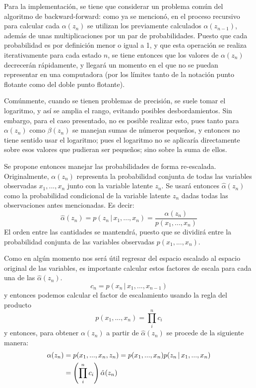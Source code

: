 Para la implementación, se tiene que considerar un problema común del algoritmo de backward-forward: como ya se mencionó, en el proceso recursivo para calcular cada $\alpha(z_n)$ se utilizan los previamente calculados $\alpha(z_{n-1})$, además de unas multiplicaciones por un par de probabilidades. Puesto que cada probabilidad es por definición menor o igual a 1, y que esta operación se realiza iterativamente para cada estado $n$, se tiene entonces que los valores de $\alpha(z_n)$ decrecerán rápidamente, y llegará un momento en el que no se puedan representar en una computadora (por los límites tanto de la notación punto flotante como del doble punto flotante).

Comúnmente, cuando se tienen problemas de precisión, se suele tomar el logaritmo, y así se amplia el rango, evitando posibles desbordamientos. Sin embargo, para el caso presentado, no es posible realizar esto, pues tanto para $\alpha(z_n)$ como $\beta(z_n)$ se manejan sumas de números pequeños, y entonces no tiene sentido usar el logaritmo; pues el logaritmo no se aplicaría directamente sobre esos valores que pudieran ser pequeños; sino sobre la suma de ellos.

Se propone entonces manejar las probabilidades de forma re-escalada. Originalmente, $\alpha(z_n)$ representa la probabilidad conjunta de todas las variables observadas $x_1, ..., x_n$ junto con la variable latente $z_n$. Se usará entonces $\hat \alpha(z_n)$ como la probabilidad condicional de la variable latente $z_n$ dadas todas las observaciones antes mencionadas. Es decir:
\begin{equation}
  \hat \alpha(z_n) = p(z_n \,|\, x_1, ..., x_n )
    = \frac{\alpha(z_n)}{p(x_1, ..., x_n)}
  \label{eqn:3-21}
\end{equation}
El orden entre las cantidades se mantendrá, puesto que se dividirá entre la probabilidad conjunta de las variables observadas $p(x_1, ..., x_n)$.

Como en algún momento nos será útil regresar del espacio escalado al espacio original de las variables, es importante calcular estos factores de escala para cada una de las $\hat \alpha(z_n)$.
\begin{equation}
  c_n = p(x_n \,|\, x_1, ..., x_{n-1})
  \label{eqn:3-22}
\end{equation}
y entonces podemos calcular el factor de escalamiento usando la regla del producto
\begin{equation}
  p(x_1, ..., x_n) = \prod_i^n c_i 
  \label{eqn:3-23}
\end{equation}
y entonces, para obtener $\alpha(z_n)$ a partir de $\hat \alpha(z_n)$ se procede de la siguiente manera:
\begin{align}
  \alpha(z_n) &= p(x_1, ..., x_n, z_n) 
    = p(x_1, ..., x_n) p(z_n \,|\, x_1, ..., x_n ) \notag \\
    &= \left( \prod_i^n c_i \right) \hat \alpha(z_n)    
  \label{eqn:3-24}
\end{align}

